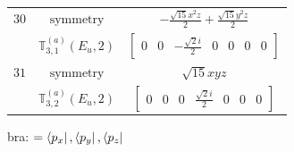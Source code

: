 \documentclass[fleqn,8pt,landscape]{jsarticle}
\begin{document}
\begin{longtable}{ccc}
$ 30 $ & $ \text{symmetry} $ & $ - \frac{\sqrt{15} x^{2} z}{2} + \frac{\sqrt{15} y^{2} z}{2} $ \\
$  $ & $ \mathbb{T}_{3,1}^{(a)}(E_{u},2) $ & $ \begin{bmatrix} 0 & 0 & - \frac{\sqrt{2} i}{2} & 0 & 0 & 0 & 0 \end{bmatrix} $ \\ \hline
$ 31 $ & $ \text{symmetry} $ & $ \sqrt{15} x y z $ \\
$  $ & $ \mathbb{T}_{3,2}^{(a)}(E_{u},2) $ & $ \begin{bmatrix} 0 & 0 & 0 & \frac{\sqrt{2} i}{2} & 0 & 0 & 0 \end{bmatrix} $ \\ \hline
\end{longtable}
bra: $=\bra{p_{x}}, \bra{p_{y}}, \bra{p_{z}}$
\end{document}
